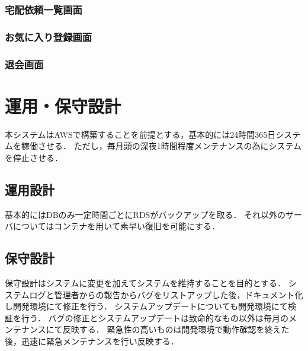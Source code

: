 \documentclass[a4paper, titlepage]{jsarticle}
\begin{document}
\subsubsection{宅配依頼一覧画面}
\subsubsection{お気に入り登録画面}
\subsubsection{退会画面}


\section{運用・保守設計}
本システムはAWSで構築することを前提とする，基本的には24時間365日システムを稼働させる．
ただし，毎月頭の深夜1時間程度メンテナンスの為にシステムを停止させる．
\subsection{運用設計}
基本的にはDBのみ一定時間ごとにRDSがバックアップを取る．
それ以外のサーバについてはコンテナを用いて素早い復旧を可能にする．

\subsection{保守設計}
保守設計はシステムに変更を加えてシステムを維持することを目的とする．
システムログと管理者からの報告からバグをリストアップした後，ドキュメント化し開発環境にて修正を行う．
システムアップデートについても開発環境にて検証を行う．
バグの修正とシステムアップデートは致命的なもの以外は毎月のメンテナンスにて反映する．
緊急性の高いものは開発環境で動作確認を終えた後，迅速に緊急メンテナンスを行い反映する．
\end{document}
